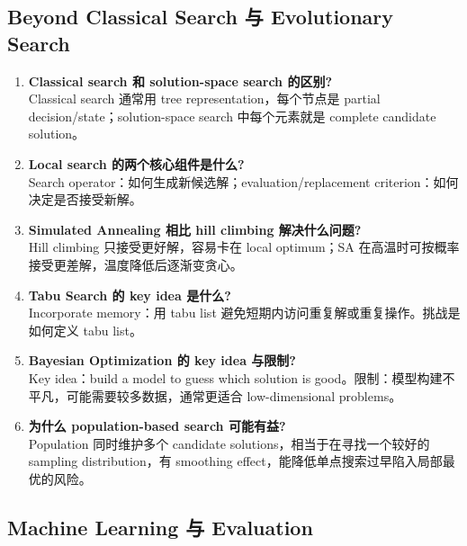 \documentclass[UTF8,11pt,a4paper]{ctexart}
\begin{document}
\subsection{Beyond Classical Search 与 Evolutionary Search}

\begin{enumerate}
\item \textbf{Classical search 和 solution-space search 的区别?}\\
Classical search 通常用 tree representation，每个节点是 partial decision/state；solution-space search 中每个元素就是 complete candidate solution。

\item \textbf{Local search 的两个核心组件是什么?}\\
Search operator：如何生成新候选解；evaluation/replacement criterion：如何决定是否接受新解。

\item \textbf{Simulated Annealing 相比 hill climbing 解决什么问题?}\\
Hill climbing 只接受更好解，容易卡在 local optimum；SA 在高温时可按概率接受更差解，温度降低后逐渐变贪心。

\item \textbf{Tabu Search 的 key idea 是什么?}\\
Incorporate memory：用 tabu list 避免短期内访问重复解或重复操作。挑战是如何定义 tabu list。

\item \textbf{Bayesian Optimization 的 key idea 与限制?}\\
Key idea：build a model to guess which solution is good。限制：模型构建不平凡，可能需要较多数据，通常更适合 low-dimensional problems。

\item \textbf{为什么 population-based search 可能有益?}\\
Population 同时维护多个 candidate solutions，相当于在寻找一个较好的 sampling distribution，有 smoothing effect，能降低单点搜索过早陷入局部最优的风险。
\end{enumerate}

\subsection{Machine Learning 与 Evaluation}
\end{document}
